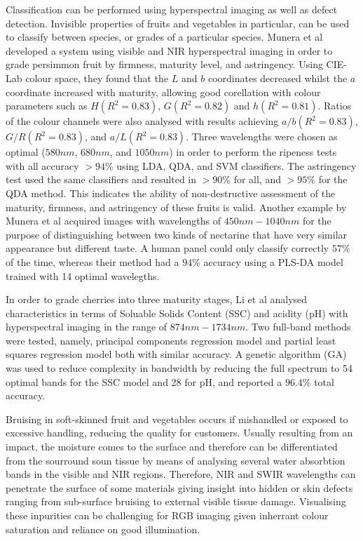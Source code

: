 \documentclass[fleqn,twoside]{article}
\begin{document}
Classification can be performed using hyperspectral imaging as well as defect detection. Invisible properties of fruits and vegetables in particular, can be used to classify between species, or grades of a particular species. Munera et al \cite{munera} developed a system using visible and NIR hyperspectral imaging in order to grade persimmon fruit by firmness, maturity level, and astringency. Using CIE-Lab colour space, they found that the $L$ and $b$ coordinates decreased whilst the $a$ coordinate increased with maturity, allowing good corellation with colour parameters such as $H(R^2 = 0.83)$, $G(R^2 = 0.82)$ and $h(R^2 = 0.81)$. Ratios of the colour channels were also analysed with results achieving $a/b(R^2 = 0.83)$, $G/R(R^2 = 0.83)$, and $a/L(R^2 = 0.83)$. Three wavelengths were chosen as optimal ($580nm$, $680nm$, and $1050nm$) in order to perform the ripeness tests with all accuracy $>94\%$ using LDA, QDA, and SVM classifiers. The astringency test used the same classifiers and resulted in $>90\%$ for all, and $>95\%$ for the QDA method. This indicates the ability of non-destructive assessment of the maturity, firmness, and astringency of these fruits is valid. Another example by Munera et al \cite{munera2} acquired images with wavelengths of $450nm-1040nm$ for the purpose of distinguishing between two kinds of nectarine that have very similar appearance but different taste. A human panel could only classify correctly $57\%$ of the time, whereas their method had a $94\%$ accuracy using a PLS-DA model trained with 14 optimal wavelegths. 

In order to grade cherries into three maturity stages, Li et al \cite{li} analysed characteristics in terms of Soluable Solids Content (SSC) and acidity (pH) with hyperspectral imaging in the range of $874nm-1734nm$. Two full-band methods were tested, namely, principal components regression model and partial least squares regression model both with similar accuracy. A genetic algorithm (GA) was used to reduce complexity in bandwidth by reducing the full spectrum to 54 optimal bands for the SSC model and 28 for pH, and reported a $96.4\%$ total accuracy.  


Bruising in soft-skinned fruit and vegetables occurs if mishandled or exposed to excessive handling, reducing the quality for customers. Usually resulting from an impact, the moisture comes to the surface and therefore can be differentiated from the sourround soun tissue by means of analysing several water absorbtion bands in the visible and NIR regions. Therefore, NIR and SWIR wavelengths can penetrate the surface of some materials giving insight into hidden or skin defects ranging from sub-surface bruising to external visible tissue damage. Visualising these inpurities can be challenging for RGB imaging given inherrant colour saturation and reliance on good illumination. 
\end{document}
